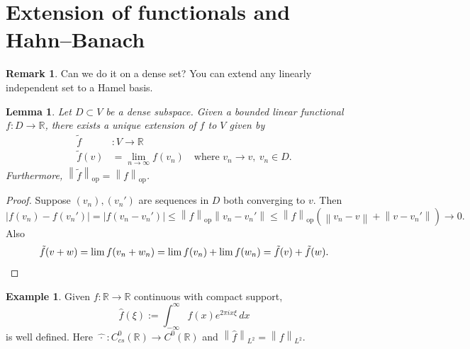 \documentclass[12pt]{article}
\newcommand{\abs}[1]{\left| #1 \right|}
\newcommand{\norm}[1]{\left\| #1 \right\|}
\newcommand{\R}{\mathbb{R}}
\newtheorem{lma}[thm]{Lemma}
\theoremstyle{definition}
\newtheorem{ex}[thm]{Example}
\newtheorem{rmk}[thm]{Remark}
\begin{document}
\section{Extension of functionals and Hahn--Banach}

\begin{rmk}
	Can we do it on a dense set?
	You can extend any linearly independent set to a Hamel basis.
\end{rmk}

\begin{lma}
	Let $D \subset V$ be a dense subspace.
	Given a bounded linear functional $f : D \to \R$, there exists a unique extension of $f$ to $V$ given by
	\begin{align*}
		\tilde{f} &: V \to \R \\
		\tilde{f}(v) &= \lim_{n \to \infty} f(v_n) \quad \text{where } v_n \to v, \ v_n \in D.
	\end{align*}
	Furthermore, $\norm{\tilde{f}}_{\mathrm{op}} = \norm{f}_{\mathrm{op}}$.
\end{lma}
\begin{proof}
	Suppose $(v_n), (v_n')$ are sequences in $D$ both converging to $v$.
	Then
	\begin{equation*}
		\abs{f(v_n) - f(v_n')} = \abs{f(v_n - v_n')} \leq \norm{f}_{\mathrm{op}} \norm{v_n - v_n'} \leq \norm{f}_{\mathrm{op}} \left( \norm{v_n - v} + \norm{v - v_n'} \right) \to 0.
	\end{equation*}
	Also
	\begin{equation*}
		\tilde{f}(v+w) = \lim f(v_n + w_n) = \lim f(v_n) + \lim f(w_n) = \tilde{f}(v) + \tilde{f}(w). \qedhere
	\end{equation*}
\end{proof}

\begin{ex}
	Given $f : \R \to \R$ continuous with compact support,
	\begin{equation*}
		\hat{f}(\xi) := \int_{-\infty}^\infty f(x) e^{2\pi i x \xi} \, dx
	\end{equation*}
	is well defined.
	Here $\widehat{\ \cdot\ } : C^0_{cs}(\R) \to C^0(\R)$ and $\norm{\hat{f}}_{L^2} = \norm{f}_{L^2}$.
\end{ex}
\end{document}
